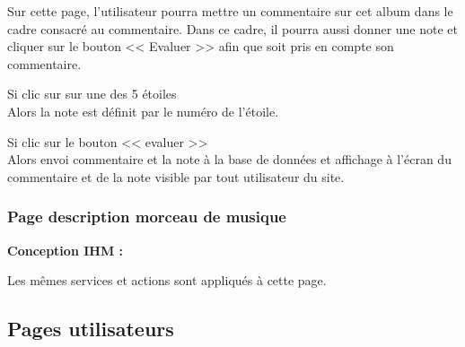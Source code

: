 
			\begin{paragraphe}
				Sur cette page, l'utilisateur pourra mettre un commentaire sur cet album dans le cadre consacré au commentaire. Dans ce cadre, il pourra aussi donner une note et cliquer sur le bouton << Evaluer >> afin que soit pris en compte son commentaire.
			\end{paragraphe}

			\begin{paragraphe}
				Si clic sur sur une des 5 étoiles \\
				Alors la note est définit par le numéro de l'étoile.
			\end{paragraphe}

			\begin{paragraphe}
				Si clic sur le bouton << evaluer >> \\
				Alors envoi commentaire et la note à la base de données et affichage à l'écran du commentaire et de la note visible par tout utilisateur du site.
			\end{paragraphe}


	\clearpage

		\subsubsection{Page description morceau de musique}

			\begin{paragraphe}
				\textbf{Conception IHM :}
			\end{paragraphe}

			\begin{paragraphe}
				Les mêmes services et actions sont appliqués à cette page.
			\end{paragraphe}



	\clearpage

	\subsection{Pages utilisateurs}
